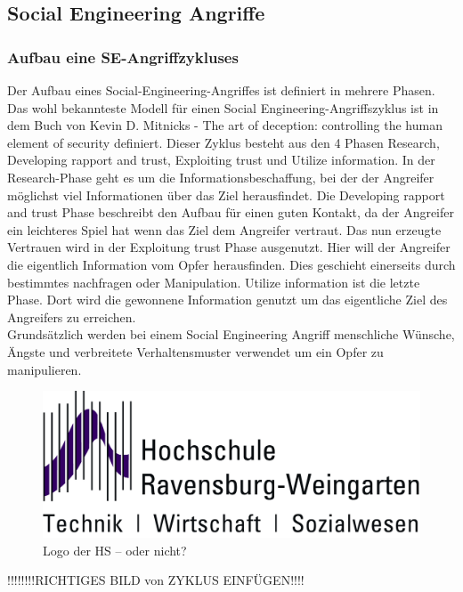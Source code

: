 \subsection{Social Engineering Angriffe}
\subsubsection{Aufbau eine SE-Angriffzykluses}
Der Aufbau eines Social-Engineering-Angriffes ist definiert in mehrere Phasen. Das wohl bekannteste Modell für einen Social Engineering-Angriffszyklus ist in dem Buch von Kevin D. Mitnicks - The art of deception: controlling the human element of security \cite{ArtOfDeception} definiert. Dieser Zyklus besteht aus den 4 Phasen Research, Developing rapport and trust, Exploiting trust und Utilize information.
In der Research-Phase geht es um die Informationsbeschaffung, bei der der Angreifer möglichst viel Informationen über das Ziel herausfindet. Die Developing rapport and trust Phase beschreibt den Aufbau für einen guten Kontakt, da der Angreifer ein leichteres Spiel hat wenn das Ziel dem Angreifer vertraut. Das nun erzeugte Vertrauen wird in der Exploitung trust Phase ausgenutzt. Hier will der Angreifer die eigentlich Information vom Opfer herausfinden. Dies geschieht einerseits durch bestimmtes nachfragen oder Manipulation. Utilize information ist die letzte Phase. Dort wird die gewonnene Information genutzt um das eigentliche Ziel des Angreifers zu erreichen.\\
Grundsätzlich werden bei einem Social Engineering Angriff menschliche Wünsche, Ängste und verbreitete Verhaltensmuster verwendet um ein Opfer zu manipulieren.\cite{LeitfadenSE}\\
\FloatBarrier
\begin{figure}
	\begin{center}
		\includegraphics*{bilder/HSLogoWGd}
		\caption{Logo der HS -- oder nicht?}
		\label{fig:logo}
	\end{center}
\end{figure}
\FloatBarrier 
!!!!!!!!RICHTIGES BILD von ZYKLUS EINFÜGEN!!!!\\

